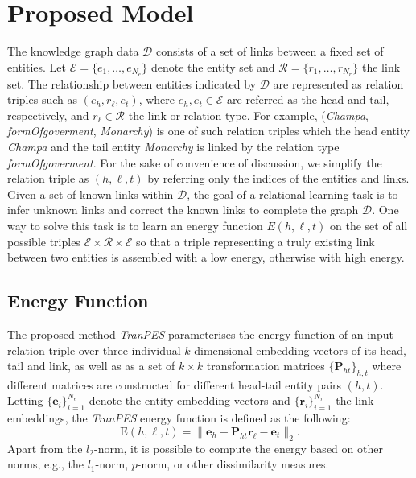 \documentclass[9pt]{sig-alternate-05-2015}
\begin{document}
\section{Proposed Model} \label{math}
The knowledge graph data $\mathcal{D}$ consists of a set of links between a fixed set of entities. Let $\mathcal{E} = \{e_1, \ldots, e_{N_e}\}$ denote the entity set and $\mathcal{R} = \{r_1, \ldots, r_{N_r}\}$ the link set.  The relationship between entities indicated by $\mathcal{D}$ are represented as relation triples such as $(e_h,r_{\ell},e_t)$, where $e_h, e_t\in \mathcal{E}$ are referred as the head  and tail, respectively, and  $r_{\ell} \in \mathcal{R}$ the link or relation type.  For example, (\emph{Champa}, \emph{formOfgoverment}, \emph{Monarchy}) is one of such relation triples which the head entity \emph{Champa} and the tail entity \emph{Monarchy} is linked by the relation type \emph{formOfgoverment}.  For the sake of convenience of discussion, we simplify the relation triple as $(h,\ell, t)$   by referring only the indices of the entities and links. Given a set of known links within $\mathcal{D}$, the goal of a relational learning task is to  infer unknown links and correct the known links to complete the graph $\mathcal{D}$. One way to solve this task is to learn an energy function $E(h, \ell, t)$ on the set of all possible triples $\mathcal{E} \times \mathcal{R} \times \mathcal{E}$ so that a triple representing a truly existing link between two entities  is assembled with a low energy, otherwise with high energy. 


\subsection{Energy Function}
The proposed method  \emph{TranPES}  parameterises the energy function of an input relation triple over three individual $k$-dimensional embedding vectors of its head, tail and link, as well as as a set of $k\times k$ transformation matrices $\{\textbf{P}_{ht}\}_{h,t}$ where different matrices are constructed for different head-tail entity pairs $(h,t)$. Letting $\{\bm e_i\}_{i=1}^{N_e}$ denote the entity embedding vectors and  $\{\bm r_i\}_{i=1}^{N_r}$ the link embeddings, the \emph{\emph{TranPES}} energy function is defined as the following:
\begin{equation} \label{energy}
\mathrm{E}{(h,\ell, t)} = \|\bm{e}_h +\textbf{P}_{ht} \bm{r}_{\ell}-\bm{e}_t\|_2.
\end{equation}
Apart from the $l_2$-norm, it is  possible to compute the energy based on other norms, e.g., the $l_1$-norm, $p$-norm, or other dissimilarity measures.
\end{document}
